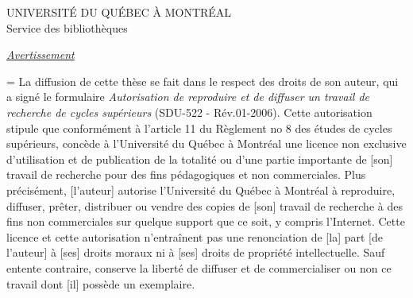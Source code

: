 \thispagestyle{empty}

{\selectfont
{
\begin{center}
UNIVERSITÉ DU QUÉBEC À MONTRÉAL\\
Service des bibliothèques
\end{center}
}
\vspace{3cm}
\begin{center}
\underline{\itshape Avertissement}
\vspace{1.5cm}
\end{center}
{
\emergencystretch=\maxdimen
{}
\noindent La diffusion de cette thèse se fait dans le respect des droits de son auteur, qui a signé le formulaire {\itshape Autorisation de reproduire et de diffuser un travail de recherche de cycles supérieurs} (SDU-522 - Rév.01-2006). 
Cette autorisation stipule que \og conformément à l'article 11 du Règlement no 8 des études de cycles supérieurs, \linebreak[4] [l'auteur] concède à l'Université du Québec à Montréal une licence non exclusive d'utilisation et de publication de la totalité ou d'une partie importante de [son] travail de recherche pour des fins pédagogiques et non commerciales. Plus précisément, [l'auteur] autorise l'Université du Québec à Montréal à reproduire, diffuser, prêter, distribuer ou vendre des copies de [son] travail de recherche à des fins non commerciales sur quelque support que ce soit, y compris l'Internet. Cette licence et cette autorisation n'entraînent pas une renonciation de [la] part [de l'auteur] à [ses] droits moraux ni à [ses] droits de propriété intellectuelle. Sauf entente contraire, \linebreak[4] [l'auteur] conserve la liberté de diffuser et de commercialiser ou non ce travail dont [il] possède un exemplaire.\fg\par
}
}
 \restoregeometry
